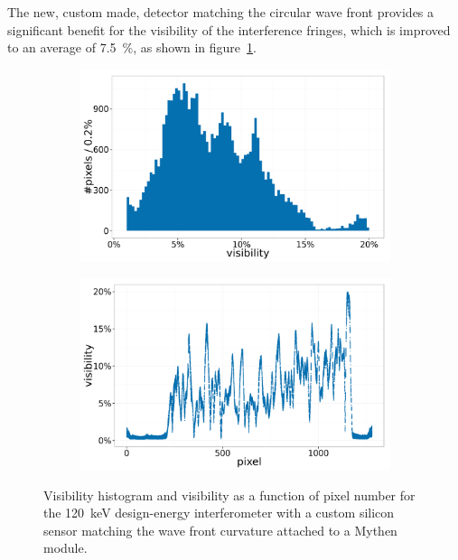 The new, custom made, detector matching the circular wave front provides a
significant benefit for the visibility of the interference fringes, which is
improved to an average of \SI{7.5}{\percent}, as shown in
figure~\ref{fig:mythen-visibility}.

\begin{figure}[htb]
    \centering
    \begin{subfigure}[b]{.49\textwidth}
    \centering
    \includegraphics[width=\textwidth]{gfx/mythen-edge-on/visibility.png}
    \caption{}
    \label{fig:mythen-visibility}
    \end{subfigure}
    \hfill
    \begin{subfigure}[b]{.49\textwidth}
    \centering
    \includegraphics[width=\textwidth]{gfx/mythen-edge-on/pixel_visibility.png}
    \caption{}
    \label{fig:mythen-visibility-pixel}
    \end{subfigure}
    \caption[Visibility of the edge-on grating interferometer with a custom
    detector.]{Visibility histogram and visibility as a function of pixel
        number for the \SI{120}{\kilo\eV} design-energy interferometer with
        a custom silicon sensor matching the wave front curvature attached
        to a Mythen module\cn.
    }
\end{figure}

